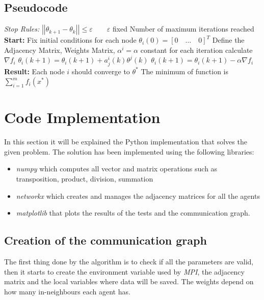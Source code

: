 \documentclass[a4paper,11pt,oneside]{book}
\begin{document}
\subsection {Pseudocode} \label{Subsec1.1.3}
\begin{algorithm}
\caption{}
\begin{algorithmic} [1]
\State \textit{Stop Rules:}
\State $\left|\left|\theta_{k+1} - \theta_k\right|\right|  \leq \varepsilon \qquad \varepsilon$ fixed
\State Number of maximum iterations reached
\State \textbf{Start:}
\State Fix initial conditions for each node $\theta_i(0) = [0 \quad ... \quad 0]^T$
\State Define the Adjacency Matrix, Weights Matrix, $\alpha^i = \alpha$ constant for each iteration
    \State calculate $\nabla f_i$
        \State $\theta_i(k+1) = \theta_i(k+1) + a^i_j(k) \theta^j(k)$
    \EndFor
    \State $\theta_i(k+1) = \theta_i(k+1) - \alpha \nabla f_i$
\EndWhile
\State \textbf{Result:}
\State Each node $i$ should converge to $\theta^*$
\State The minimum of function is $\sum \limits_{i=1}^{m}f_i(x^*)$
\end{algorithmic}
\end{algorithm}


\section {Code Implementation} \label{Sec1.2}

In this section it will be explained the Python implementation that solves the given problem. The solution has been implemented using the following libraries:
\begin{itemize}
	\item  \textit{numpy} which computes all vector and matrix operations such as transposition, product, division,
	summation
	\item \textit{networkx} which creates and manages the adjacency matrices for all the agents
	\item \textit{matplotlib} that plots the results
	of the tests and the communication graph.
\end{itemize}

\subsection{Creation of the communication graph}
The first thing done by the algorithm is to check if all the parameters are valid,
then it starts to create the environment variable used by \textit{MPI}, the adjacency matrix and the local variables where data will be saved. The weights depend on how many in-neighbours each agent has. \\
\end{document}
